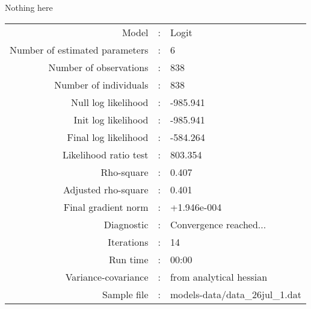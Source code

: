 Nothing here\\


\begin{flushleft}
\begin{tabular}{rcl}
\hline
Model &:& Logit\\
Number of estimated parameters&:&6\\
Number of  observations &:& 838\\
Number of individuals&:&838\\
Null log likelihood&:&-985.941\\
Init log likelihood&:&-985.941\\
Final log likelihood&:&-584.264\\
Likelihood ratio test &:&803.354\\
Rho-square&:&0.407\\
Adjusted rho-square&:&0.401\\
Final gradient norm&:&+1.946e-004\\
Diagnostic&:&Convergence reached...\\
Iterations&:&14\\
Run time&:&00:00\\
Variance-covariance&:&from analytical hessian
\\
Sample file&:&models-data/data_26jul_1.dat\\
\end{tabular}
\end{flushleft}
